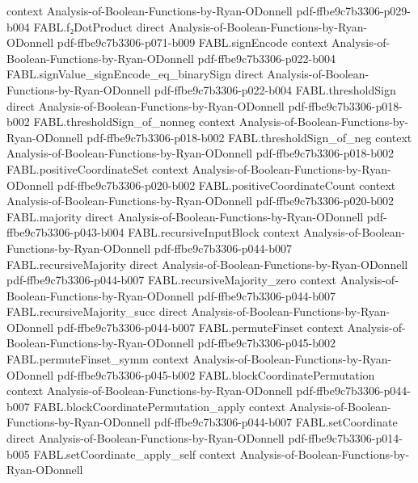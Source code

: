 \begin{theorem}
  {context}
  {Analysis-of-Boolean-Functions-by-Ryan-ODonnell}
  {pdf-ffbe9c7b3306-p029-b004}
\proofstep
  {FABL.f₂DotProduct}
  {direct}
  {Analysis-of-Boolean-Functions-by-Ryan-ODonnell}
  {pdf-ffbe9c7b3306-p071-b009}
\proofstep
  {FABL.signEncode}
  {context}
  {Analysis-of-Boolean-Functions-by-Ryan-ODonnell}
  {pdf-ffbe9c7b3306-p022-b004}
\proofstep
  {FABL.signValue_signEncode_eq_binarySign}
  {direct}
  {Analysis-of-Boolean-Functions-by-Ryan-ODonnell}
  {pdf-ffbe9c7b3306-p022-b004}
\proofstep
  {FABL.thresholdSign}
  {direct}
  {Analysis-of-Boolean-Functions-by-Ryan-ODonnell}
  {pdf-ffbe9c7b3306-p018-b002}
\proofstep
  {FABL.thresholdSign_of_nonneg}
  {context}
  {Analysis-of-Boolean-Functions-by-Ryan-ODonnell}
  {pdf-ffbe9c7b3306-p018-b002}
\proofstep
  {FABL.thresholdSign_of_neg}
  {context}
  {Analysis-of-Boolean-Functions-by-Ryan-ODonnell}
  {pdf-ffbe9c7b3306-p018-b002}
\proofstep
  {FABL.positiveCoordinateSet}
  {context}
  {Analysis-of-Boolean-Functions-by-Ryan-ODonnell}
  {pdf-ffbe9c7b3306-p020-b002}
\proofstep
  {FABL.positiveCoordinateCount}
  {context}
  {Analysis-of-Boolean-Functions-by-Ryan-ODonnell}
  {pdf-ffbe9c7b3306-p020-b002}
\proofstep
  {FABL.majority}
  {direct}
  {Analysis-of-Boolean-Functions-by-Ryan-ODonnell}
  {pdf-ffbe9c7b3306-p043-b004}
\proofstep
  {FABL.recursiveInputBlock}
  {context}
  {Analysis-of-Boolean-Functions-by-Ryan-ODonnell}
  {pdf-ffbe9c7b3306-p044-b007}
\proofstep
  {FABL.recursiveMajority}
  {direct}
  {Analysis-of-Boolean-Functions-by-Ryan-ODonnell}
  {pdf-ffbe9c7b3306-p044-b007}
\proofstep
  {FABL.recursiveMajority_zero}
  {context}
  {Analysis-of-Boolean-Functions-by-Ryan-ODonnell}
  {pdf-ffbe9c7b3306-p044-b007}
\proofstep
  {FABL.recursiveMajority_succ}
  {direct}
  {Analysis-of-Boolean-Functions-by-Ryan-ODonnell}
  {pdf-ffbe9c7b3306-p044-b007}
\proofstep
  {FABL.permuteFinset}
  {context}
  {Analysis-of-Boolean-Functions-by-Ryan-ODonnell}
  {pdf-ffbe9c7b3306-p045-b002}
\proofstep
  {FABL.permuteFinset_symm}
  {context}
  {Analysis-of-Boolean-Functions-by-Ryan-ODonnell}
  {pdf-ffbe9c7b3306-p045-b002}
\proofstep
  {FABL.blockCoordinatePermutation}
  {context}
  {Analysis-of-Boolean-Functions-by-Ryan-ODonnell}
  {pdf-ffbe9c7b3306-p044-b007}
\proofstep
  {FABL.blockCoordinatePermutation_apply}
  {context}
  {Analysis-of-Boolean-Functions-by-Ryan-ODonnell}
  {pdf-ffbe9c7b3306-p044-b007}
\proofstep
  {FABL.setCoordinate}
  {direct}
  {Analysis-of-Boolean-Functions-by-Ryan-ODonnell}
  {pdf-ffbe9c7b3306-p014-b005}
\proofstep
  {FABL.setCoordinate_apply_self}
  {context}
  {Analysis-of-Boolean-Functions-by-Ryan-ODonnell}

\end{theorem}
